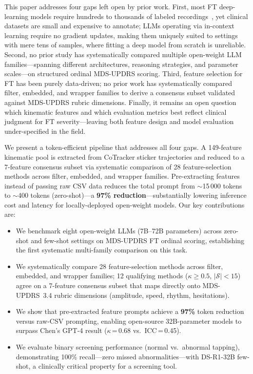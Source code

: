 \documentclass[conference]{IEEEtran}
\begin{document}
This paper addresses four gaps left open by prior work.
First, most FT deep-learning models require hundreds to thousands of labeled
recordings~\cite{li2021automated,yang2024deep}, yet clinical datasets are small and
expensive to annotate; LLMs operating via in-context learning require no gradient updates,
making them uniquely suited to settings with mere tens of samples, where fitting a deep model from scratch
is unreliable.
Second, no prior study has systematically compared multiple open-weight LLM
families---spanning different architectures, reasoning strategies, and parameter
scales---on structured ordinal MDS-UPDRS scoring.
Third, feature selection for FT has been purely data-driven; no prior work has
systematically compared filter, embedded, and wrapper families to derive a
consensus subset validated against MDS-UPDRS rubric dimensions.
Finally, it remains an open question which kinematic features and which evaluation
metrics best reflect clinical judgment for FT severity---leaving both feature design
and model evaluation under-specified in the field.

We present a token-efficient pipeline that addresses all four gaps.
A 149-feature kinematic pool is extracted from CoTracker sticker trajectories
and reduced to a 7-feature consensus subset via systematic comparison of 28
feature-selection methods across filter, embedded, and wrapper families.
Pre-extracting features instead of passing raw CSV data reduces the total prompt from
$\sim$15\,000 tokens to $\sim$400 tokens (zero-shot)---a \textbf{97\% reduction}---substantially
lowering inference cost and latency for locally-deployed open-weight models.
Our key contributions are:

\begin{itemize}
    \item We benchmark eight open-weight LLMs (7B--72B parameters) across zero-shot and
          few-shot settings on MDS-UPDRS FT ordinal scoring, establishing the first
          systematic multi-family comparison on this task.
    \item We systematically compare 28 feature-selection methods across filter,
          embedded, and wrapper families; 12 qualifying methods ($\kappa \geq 0.5$,
          $|\mathcal{S}| < 15$) agree on a 7-feature consensus subset that maps
          directly onto MDS-UPDRS~3.4 rubric dimensions (amplitude, speed, rhythm,
          hesitations).
    \item We show that pre-extracted feature prompts achieve a \textbf{97\%} token
          reduction versus raw-CSV prompting, enabling open-source 32B-parameter
          models to surpass Chen's GPT-4 result ($\kappa$\,=\,0.68 vs.\ ICC\,=\,0.45).
    \item We evaluate binary screening performance (normal vs.\ abnormal tapping),
          demonstrating 100\% recall---zero missed abnormalities---with DS-R1-32B
          few-shot, a clinically critical property for a screening tool.
\end{itemize}
\end{document}
